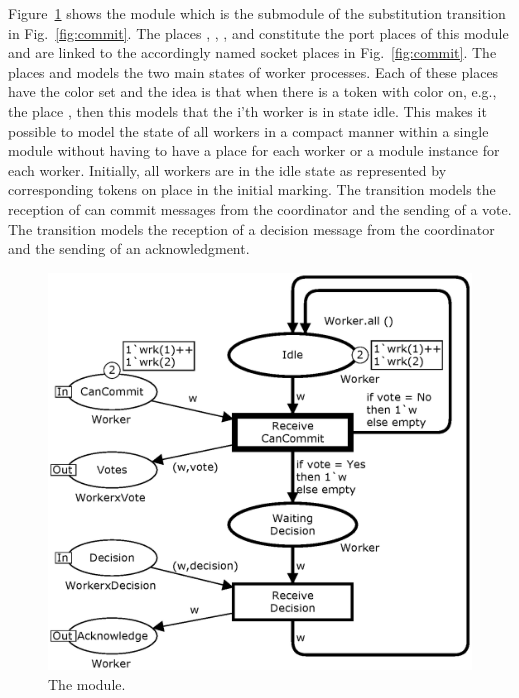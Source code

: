 

Figure~\ref{fig:worker} shows the  module which is the
submodule of the  substitution transition in
Fig.~\ref{fig:commit}. The places ,
, , and 
constitute the port places of this module and are linked to the
accordingly named socket places in Fig.~\ref{fig:commit}. The places
 and  models the two main
states of worker processes. Each of these places have the color set
 and the idea is that when there is a token with color
 on, e.g., the place , then this models
that the i'th worker is in state idle. This makes it possible to model
the state of all workers in a compact manner within a single module
without having to have a place for each worker or a module instance
for each worker. Initially, all workers are in the idle state as
represented by corresponding tokens on place  in the
initial marking. The transition  models the
reception of can commit messages from the coordinator and the sending
of a vote. The transition  models the
reception of a decision message from the coordinator and the sending
of an acknowledgment.

\begin{figure}[]
\centering
\includegraphics[scale=.5]{figures/Workers.eps}
\caption{The  module.}
\label{fig:worker}
\end{figure}

